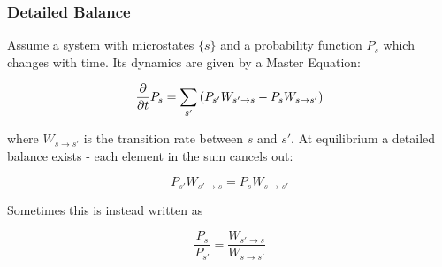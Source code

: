 \subsubsection{Detailed Balance}

Assume a system with microstates $\{s\}$ and a probability function $P_s$ which changes with time. Its dynamics are given by a Master Equation:

\begin{equation}
	\diffp{}{t}P_s = \sum\limits_{s'}\left(P_{s'}W_{s'\rightarrow s} - P_sW_{s\rightarrow s'}\right)
\end{equation}

where $W_{s\rightarrow s'}$ is the transition rate between $s$ and $s'$. At equilibrium a detailed balance exists - each element in the sum cancels out:

\begin{equation}
	P_{s'}W_{s'\rightarrow s} = P_sW_{s\rightarrow s'}
\end{equation}

Sometimes this is instead written as

\begin{equation}
	\frac{P_s}{P_{s'}} = \frac{W_{s'\rightarrow s}}{W_{s\rightarrow s'}}
\end{equation}